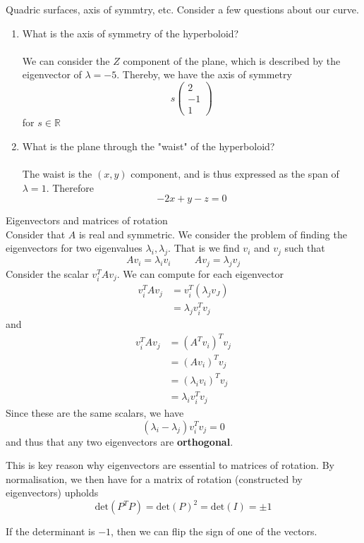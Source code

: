 \documentclass[journal, letterpaper]{IEEEtran}
\begin{document}
\begin{myboxg}{Quadric surfaces, axis of symmtry, etc.}
        Consider a few questions about our curve.
        \begin{enumerate}
            \item What is the axis of symmetry of the hyperboloid? \\ \\
                We can consider the $Z$ component of the plane, which is described by the eigenvector of $\lambda = -5$. Thereby, we have the axis of symmetry
                $$ s\begin{pmatrix}
                    2 \\ -1 \\ 1
                \end{pmatrix}$$
                for $s \in \mathbb{R}$
            \item What is the plane through the "waist" of the hyperboloid? \\ \\ 
            The waist is the $(x, y)$ component, and is thus expressed as the span of $\lambda = 1$. Therefore
            $$ -2x + y - z = 0$$
        \end{enumerate}
    \end{myboxg}
    \begin{mybox}{Eigenvectors and matrices of rotation} \\
        Consider that $A$ is real and symmetric. We consider the problem of finding the eigenvectors for
        two eigenvalues $\lambda_i, \lambda_j$. That is we find $v_i$ and $v_j$ such that
        $$ Av_i = \lambda_iv_i \hspace{1cm} Av_j = \lambda_jv_j$$
        Consider the scalar $v_i^TAv_j$. We can compute for each eigenvector
        \begin{align*}
            v_i^TAv_j &= v_i^T(\lambda_jv_J) \\ 
            &= \lambda_jv_i^Tv_j
        \end{align*}
        and
        \begin{align*}
            v_i^TAv_j &= (A^Tv_i)^Tv_j \\
            &= (Av_i)^Tv_j \\
            &= (\lambda_iv_i)^Tv_j \\
            &= \lambda_iv_i^Tv_j
        \end{align*}
        Since these are the same scalars, we have
        $$ (\lambda_i - \lambda_j)v_i^Tv_j = 0$$
        and thus that any two eigenvectors are \textbf{orthogonal}.
        \begin{center}
            This is key reason why eigenvectors are essential to matrices of rotation. By normalisation, we then 
            have for a matrix of rotation (constructed by eigenvectors) upholds
            $$ \text{det}(P^TP) = \text{det}(P)^2 = \text{det}(I) = \pm 1$$
        \end{center}
        If the determinant is $-1$, then we can flip the sign of one of the vectors.
    \end{mybox}
\end{document}
